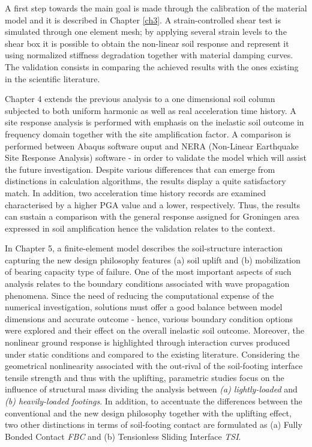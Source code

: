 \documentclass[12pt,a4paper]{report}
\begin{document}
A first step towards the main goal is made through the calibration of the material model and it is described in Chapter \ref{ch3}. A strain-controlled shear test is simulated through one element mesh;  by applying several strain levels to the shear box it is possible to obtain the non-linear soil response and represent it using normalized stiffness degradation together with material damping curves. The validation consists in comparing the achieved results with the ones existing in the scientific literature.

Chapter 4 extends the previous analysis to a one dimensional soil column subjected to both uniform harmonic as well as real acceleration time history. A site response analysis is performed with emphasis on the inelastic soil outcome in frequency domain together with the site amplification factor. A comparison is performed between Abaqus software ouput and NERA (Non-Linear Earthquake Site Response Analysis) software - in order to validate the model which will assist the future investigation. Despite various differences that can emerge from distinctions in calculation algorithms, the results display a quite satisfactory match. In addition, two acceleration time history records  are examined characterised by a higher PGA value and a lower, respectively. Thus, the results can sustain a comparison with the general response assigned for Groningen area expressed in soil amplification hence the validation relates to the context.

In Chapter 5, a finite-element model describes the soil-structure interaction capturing the new design philosophy features (a) soil uplift and (b) mobilization of bearing capacity type of failure. One of the most important aspects of such analysis relates to the boundary conditions associated with wave propagation phenomena. Since the need of reducing the computational expense of the numerical investigation, solutions must offer a good balance between model dimensions and accurate outcome - hence, various boundary condition options were explored and their effect on the overall inelastic soil outcome. Moreover, the nonlinear ground response is highlighted through interaction curves produced under static conditions and compared to the existing literature. Considering the geometrical nonlinearity associated with the out-rival of the soil-footing interface tensile strength and thus with the uplifting, parametric studies focus on the influence of structural mass dividing the analysis between \textit{(a) lightly-loaded} and \textit{(b) heavily-loaded footings}. In addition, to accentuate the differences between the conventional and the new design philosophy together with the uplifting effect, two other distinctions in terms of soil-footing contact are formulated as (a) Fully Bonded Contact \textit{FBC} and (b) Tensionless Sliding Interface \textit{TSI}.
\end{document}
